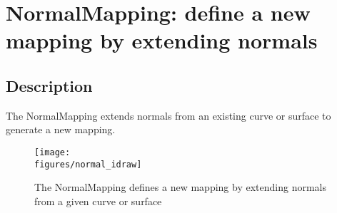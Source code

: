 \section{NormalMapping: define a new mapping by extending normals}

\subsection{Description}

The {\ff NormalMapping} extends normals from an existing
curve or surface to generate a new mapping.
\begin{figure}[ht]
  \begin{center}
  \texttt{[image: \\figures/normal\_idraw]} \\
  \caption{The NormalMapping defines a new mapping by extending normals from a 
           given curve or surface}
  \end{center}
\label{fig:NormalMapping}
\end{figure}





